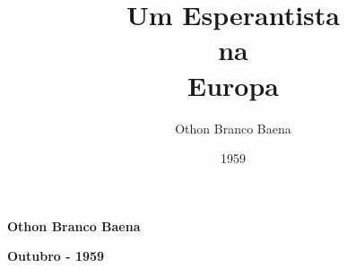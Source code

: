 \documentclass[12pt,toc=chapterentrywithdots]{scrbook}
\begin{document}
\title{Um Esperantista\\
na \\
Europa }
\author{Othon Branco Baena}
\date{1959}
\maketitle

\thispagestyle{empty}
 
\tableofcontents







\begin{center}
  \textbf{Othon Branco Baena}
  
    \textbf{Outubro - 1959}
\end{center}

\printindex
\end{document}
